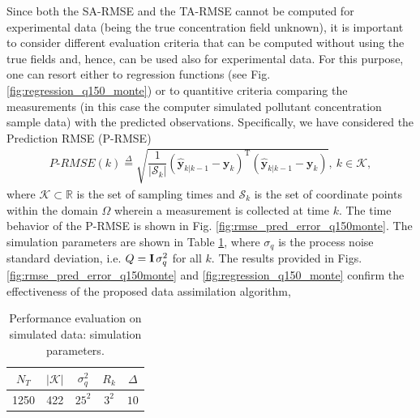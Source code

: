 \documentclass[journal]{IEEEtran}
\newcommand{\mb}{\mathbf}
\begin{document}
Since both the SA-RMSE and the TA-RMSE cannot be computed for experimental data (being the true concentration field unknown), it is  important to consider different evaluation criteria that
can be computed without using the true fields and, hence, can be used also for experimental data. For this purpose, one can resort either to regression functions
(see Fig. \ref{fig:regression_q150_monte}) or to quantitive criteria comparing the measurements (in this case the computer simulated pollutant concentration sample data) with the predicted observations.
Specifically, we have considered the Prediction RMSE (P-RMSE)
\begin{align} \label{eq:rmse_meas_4_4}
P\mbox{-}RMSE(k) \overset{\Delta}{=} \sqrt{\dfrac{1}{|\mathcal{S}_k|}(\hat{\mb{y}}_{k|k-1}-\mb{y}_k)^{\mathrm{T}}(\hat{\mb{y}}_{k|k-1}-\mb{y}_k)}, \ k \in \mathcal{K},
\end{align}
where $\mathcal{K} \subset \mathbb{R}$ is the set of sampling times and $\mathcal{S}_k$ is the set of coordinate points within the domain $\Omega$ wherein a measurement is collected at time $k$.
The time behavior of the P-RMSE is shown in Fig. \ref{fig:rmse_pred_error_q150monte}. The simulation parameters are shown in Table \ref{tab:Parameter_simulation_q150}, where $\sigma_{q}$ is the process noise standard deviation, i.e. $Q = \mb{I} \hspace{0.5mm} \sigma_{q}^{2}$ for all $k$. The results provided in Figs. \ref{fig:rmse_pred_error_q150monte} and \ref{fig:regression_q150_monte} confirm the effectiveness of the proposed data assimilation algorithm,



\begin{table}[tbp]
 \centering
 \begin{center}  
  \begin{tabular}{|c|c|c|c|c|}
\hline
  $N_T$ & $|\mathcal{K}|$ & $\sigma_{q}^{2}$ & $R_k$ & $\Delta$ \\  \hline
 1250 & 422 & $25^2$ & $3^2$ & $10$ \\
\hline
  \end{tabular}
\end{center}  
\caption{Performance evaluation on simulated data: simulation parameters.}
  \label{tab:Parameter_simulation_q150}
\end{table}
\end{document}
